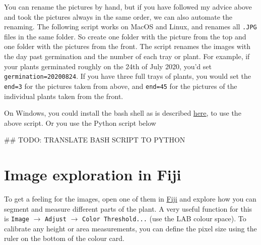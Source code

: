 \documentclass[10pt]{article}
\begin{document}
 You can rename the pictures by hand, but if you have followed my advice above and took the pictures always in the same order, we can also automate the renaming. The following script works on MacOS and Linux, and renames all \texttt{.JPG} files in the same folder. So create one folder with the picture from the top and one folder with the pictures from the front. The script renames the images with the day past germination and the number of each tray or plant. For example, if your plants germinated roughly on the 24th of July 2020, you'd set \texttt{germination=20200824}. If you have three full trays of plants, you would set the \texttt{end=3}  for the pictures taken from above, and \texttt{end=45} for the pictures of the individual plants taken from the front.
 

On Windows, you could install the bash shell as is described \href{https://www.howtogeek.com/249966/how-to-install-and-use-the-linux-bash-shell-on-windows-10/}{here}, to use the above script. Or you use the Python script below

\begin{pycode}
	## TODO: TRANSLATE BASH SCRIPT TO PYTHON
\end{pycode}

 
 \section{Image exploration in Fiji}
 
 To get a feeling for the images, open one of them in \href{https://imagej.net/Fiji/Downloads}{Fiji} and explore how you can segment and measure different parts of the plant. A very useful function for this is \texttt{Image} $\rightarrow$ \texttt{Adjust} $\rightarrow$ \texttt{Color Threshold...} (use the LAB colour space). To calibrate any height or area measurements, you can define the pixel size using the ruler on the bottom of the colour card.
 
\end{document}
